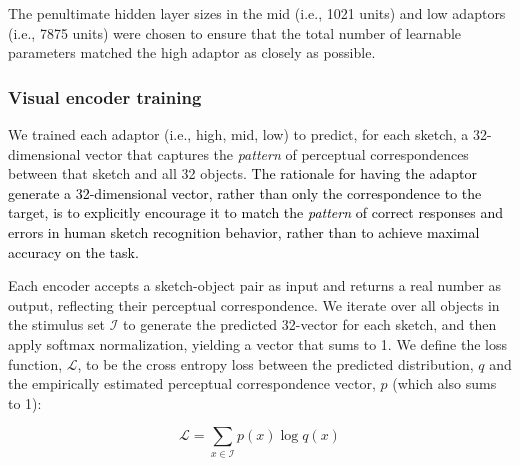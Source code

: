 \documentclass{svjour3}
\newcommand{\revised}[1]{\textcolor{Black}{#1}}
\begin{document}
The penultimate hidden layer sizes in the mid (i.e., 1021 units) and low adaptors (i.e., 7875 units) were chosen to ensure that the total number of learnable parameters matched the high adaptor as closely as possible. 


\subsubsection*{Visual encoder training}

We trained each adaptor (i.e., high, mid, low) to predict, for each sketch, a 32-dimensional vector that captures the \textit{pattern} of perceptual correspondences between that sketch and all 32 objects. 
\revised{The rationale for having the adaptor generate a 32-dimensional vector, rather than only the correspondence to the target, is to explicitly encourage it to match the \textit{pattern} of correct responses and errors in human sketch recognition behavior, rather than to achieve maximal accuracy on the task.}

Each encoder accepts a sketch-object pair as input and returns a real number as output, 
reflecting their perceptual correspondence.
We iterate over all objects in the stimulus set $\mathcal{I}$ to generate the predicted 32-vector for each sketch, and then apply softmax normalization, yielding a vector that sums to 1. 
We define the loss function, $\mathcal{L}$, to be the cross entropy loss between the predicted distribution, $q$ and the empirically estimated perceptual correspondence vector, $p$ (which also sums to 1):

\begin{equation}
    \mathcal{L} = \sum_{x \in \mathcal{I}} p(x)\log q(x)
    \label{eqn:cross_entropy}
\end{equation}

\end{document}
